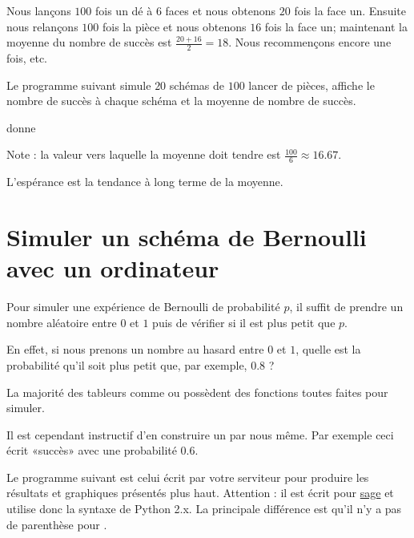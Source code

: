 \begin{example}
    Nous lançons \( 100\) fois un dé à \( 6\) faces et nous obtenons \( 20\) fois la face un. Ensuite nous relançons \( 100\) fois la pièce et nous obtenons \( 16\) fois la face un; maintenant la moyenne du nombre de succès est \( \frac{ 20+16 }{ 2 }=18\). Nous recommençons encore une fois, etc.

Le programme suivant simule \( 20\) schémas de \( 100\) lancer de pièces, affiche le nombre de succès à chaque schéma et la moyenne de nombre de succès.

donne

Note : la valeur vers laquelle la moyenne doit tendre est \( \frac{ 100 }{ 6 }\approx 16.67\).

\end{example}
L'espérance est la tendance à long terme de la moyenne.

\section{Simuler un schéma de Bernoulli avec un ordinateur}

Pour simuler une expérience de Bernoulli de probabilité \( p\), il suffit de prendre un nombre aléatoire entre \( 0\) et \( 1\) puis de vérifier si il est plus petit que \( p\).

En effet, si nous prenons un nombre au hasard entre \( 0\) et \( 1\), quelle est la probabilité qu'il soit plus petit que, par exemple, \( 0.8\) ?

La majorité des tableurs comme  ou  possèdent des fonctions toutes faites pour simuler.

Il est cependant instructif d'en construire un par nous même. Par exemple ceci écrit «succès» avec une probabilité \( 0.6\).


Le programme suivant est celui écrit par votre serviteur pour produire les résultats et graphiques présentés plus haut. Attention : il est écrit pour \href{http://sagemath.org}{sage} et utilise donc la syntaxe de Python 2.x. La principale différence est qu'il n'y a pas de parenthèse pour .


